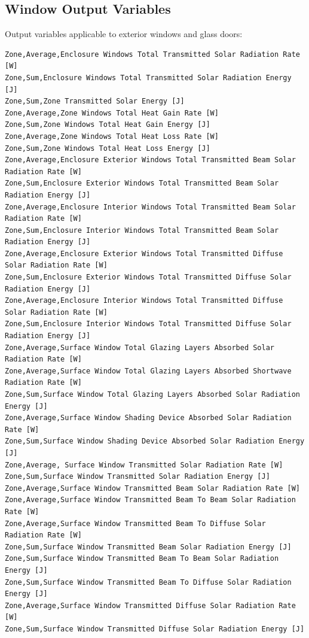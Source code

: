 \subsection{Window Output Variables}\label{window-output-variables}

Output variables applicable to exterior windows and glass doors:

\begin{lstlisting}
Zone,Average,Enclosure Windows Total Transmitted Solar Radiation Rate [W]
Zone,Sum,Enclosure Windows Total Transmitted Solar Radiation Energy [J]
Zone,Sum,Zone Transmitted Solar Energy [J]
Zone,Average,Zone Windows Total Heat Gain Rate [W]
Zone,Sum,Zone Windows Total Heat Gain Energy [J]
Zone,Average,Zone Windows Total Heat Loss Rate [W]
Zone,Sum,Zone Windows Total Heat Loss Energy [J]
Zone,Average,Enclosure Exterior Windows Total Transmitted Beam Solar Radiation Rate [W]
Zone,Sum,Enclosure Exterior Windows Total Transmitted Beam Solar Radiation Energy [J]
Zone,Average,Enclosure Interior Windows Total Transmitted Beam Solar Radiation Rate [W]
Zone,Sum,Enclosure Interior Windows Total Transmitted Beam Solar Radiation Energy [J]
Zone,Average,Enclosure Exterior Windows Total Transmitted Diffuse Solar Radiation Rate [W]
Zone,Sum,Enclosure Exterior Windows Total Transmitted Diffuse Solar Radiation Energy [J]
Zone,Average,Enclosure Interior Windows Total Transmitted Diffuse Solar Radiation Rate [W]
Zone,Sum,Enclosure Interior Windows Total Transmitted Diffuse Solar Radiation Energy [J]
Zone,Average,Surface Window Total Glazing Layers Absorbed Solar Radiation Rate [W]
Zone,Average,Surface Window Total Glazing Layers Absorbed Shortwave Radiation Rate [W]
Zone,Sum,Surface Window Total Glazing Layers Absorbed Solar Radiation Energy [J]
Zone,Average,Surface Window Shading Device Absorbed Solar Radiation Rate [W]
Zone,Sum,Surface Window Shading Device Absorbed Solar Radiation Energy [J]
Zone,Average, Surface Window Transmitted Solar Radiation Rate [W]
Zone,Sum,Surface Window Transmitted Solar Radiation Energy [J]
Zone,Average,Surface Window Transmitted Beam Solar Radiation Rate [W]
Zone,Average,Surface Window Transmitted Beam To Beam Solar Radiation Rate [W]
Zone,Average,Surface Window Transmitted Beam To Diffuse Solar Radiation Rate [W]
Zone,Sum,Surface Window Transmitted Beam Solar Radiation Energy [J]
Zone,Sum,Surface Window Transmitted Beam To Beam Solar Radiation Energy [J]
Zone,Sum,Surface Window Transmitted Beam To Diffuse Solar Radiation Energy [J]
Zone,Average,Surface Window Transmitted Diffuse Solar Radiation Rate [W]
Zone,Sum,Surface Window Transmitted Diffuse Solar Radiation Energy [J]

\end{lstlisting}
